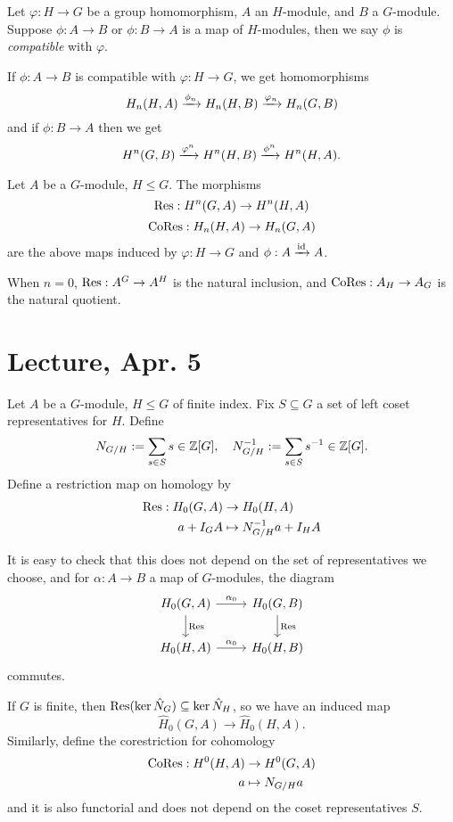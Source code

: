 \documentclass[11pt]{amsart}
\begin{document}
\begin{defn}
    Let $\varphi:H\to G$ be a group homomorphism, $A$ an $H$-module, and $B$ a $G$-module. Suppose $\phi: A\to B$ or $\phi: B\to A$ is a map of $H$-modules, then we say $\phi$ is \emph{compatible} with $\varphi$.
\end{defn}

If $\phi:A\to B$ is compatible with $\varphi:H\to G$, we get homomorphisms
\[H_n(H,A) \xrightarrow{\phi_n} H_n(H,B) \xrightarrow{\varphi_n} H_n(G, B)\]
and if $\phi: B\to A$ then we get
\[H^n(G,B) \xrightarrow{\varphi^n} H^n(H,B) \xrightarrow{\phi^n} H^n(H,A).\]

\begin{defn}
    Let $A$ be a $G$-module, $H\le G$. The morphisms
    \[\operatorname{Res}: H^n(G,A) \to H^n(H,A)\]
    \[\operatorname{CoRes}: H_n(H,A) \to H_n(G,A)\]
    are the above maps induced by $\varphi: H\to G$ and $\phi: A\xrightarrow{\operatorname{id}} A$.
\end{defn}

\begin{exm}
    When $n=0$, $\operatorname{Res}: A^G \to A^H$ is the natural inclusion, and $\operatorname{CoRes}: A_H\to A_G$ is the natural quotient.
\end{exm}


\section{Lecture, Apr. 5}

\begin{defn}
Let $A$ be a $G$-module, $H\le G$ of finite index. Fix $S\subseteq G$ a set of left coset representatives for $H$. Define 
\[N_{G/H} := \sum_{s\in S} s\in \mathbb{Z}[G], \quad N_{G/H}^{-1} := \sum_{s\in S} s^{-1} \in \mathbb{Z}[G].\]
Define a restriction map on homology by
\begin{align*}
    \operatorname{Res}: H_0(G,A) &\to H_0(H,A)\\
    a + I_GA &\mapsto N_{G/H}^{-1}a + I_H A
\end{align*}
\end{defn}

It is easy to check that this does not depend on the set of representatives we choose, and for $\alpha: A\to B$ a map of $G$-modules, the diagram
\[
\begin{tikzcd}
    H_0(G, A) \arrow[d, "{\Res}"] \arrow[r, "\alpha_0"] & H_0(G,B) \arrow[d, "{\Res}"] \\
    H_0(H, A) \arrow[r, "\alpha_0"] & H_0(H,B)
\end{tikzcd}
\]
commutes.

If $G$ is finite, then $\operatorname{Res}(\ker \hat{N}_G) \subseteq \ker \hat{N}_H$, so we have an induced map
\[\hat{H}_0(G,A) \to \hat{H}_0(H,A).\]
Similarly, define the corestriction for cohomology
\begin{align*}
    \operatorname{CoRes}: H^0(H,A) &\to H^0(G,A)\\
    a &\mapsto N_{G/H}a
\end{align*}
and it is also functorial and does not depend on the coset representatives $S$.
\end{document}
